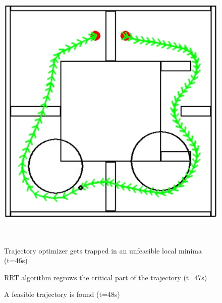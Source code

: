 \begin{figure}[!htb]
\begin{minipage}[b]{.3\linewidth}
        \centering
        \includegraphics[width=0.8\linewidth]{Figures/07_simulation/basic/10basic.png}
    \end{minipage}\\[-7pt]
    \begin{minipage}[t]{.3\linewidth}
        \caption{Trajectory optimizer gets trapped in an unfeasible local minima (t=46s)}
        \label{fig:basic08}
    \end{minipage}%
    \hfill%
    \begin{minipage}[t]{.3\linewidth}
        \caption{RRT algorithm regrows the critical part of the trajectory (t=47s)}
        \label{fig:basic09}
    \end{minipage}%
    \hfill%
    \begin{minipage}[t]{.3\linewidth}
        \caption{A feasible trajectory is found (t=48s)}
        \label{fig:basic10}
    \end{minipage}%
\end{figure}


